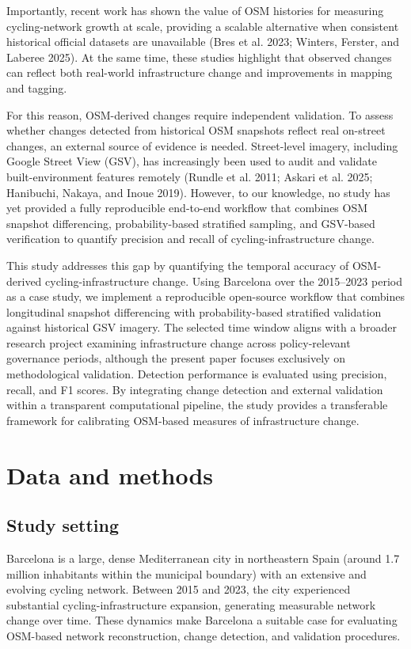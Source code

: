 \documentclass[
]{article}
\begin{document}
Importantly, recent work has shown the value of OSM histories for
measuring cycling-network growth at scale, providing a scalable
alternative when consistent historical official datasets are unavailable
(Bres et al. 2023; Winters, Ferster, and Laberee 2025). At the same
time, these studies highlight that observed changes can reflect both
real-world infrastructure change and improvements in mapping and
tagging.

For this reason, OSM-derived changes require independent validation. To
assess whether changes detected from historical OSM snapshots reflect
real on-street changes, an external source of evidence is needed.
Street-level imagery, including Google Street View (GSV), has
increasingly been used to audit and validate built-environment features
remotely (Rundle et al. 2011; Askari et al. 2025; Hanibuchi, Nakaya, and
Inoue 2019). However, to our knowledge, no study has yet provided a
fully reproducible end-to-end workflow that combines OSM snapshot
differencing, probability-based stratified sampling, and GSV-based
verification to quantify precision and recall of cycling-infrastructure
change.

This study addresses this gap by quantifying the temporal accuracy of
OSM-derived cycling-infrastructure change. Using Barcelona over the
2015--2023 period as a case study, we implement a reproducible
open-source workflow that combines longitudinal snapshot differencing
with probability-based stratified validation against historical GSV
imagery. The selected time window aligns with a broader research project
examining infrastructure change across policy-relevant governance
periods, although the present paper focuses exclusively on
methodological validation. Detection performance is evaluated using
precision, recall, and F1 scores. By integrating change detection and
external validation within a transparent computational pipeline, the
study provides a transferable framework for calibrating OSM-based
measures of infrastructure change.

\section{Data and methods}\label{data-and-methods}

\subsection{Study setting}\label{study-setting}

Barcelona is a large, dense Mediterranean city in northeastern Spain
(around 1.7 million inhabitants within the municipal boundary) with an
extensive and evolving cycling network. Between 2015 and 2023, the city
experienced substantial cycling-infrastructure expansion, generating
measurable network change over time. These dynamics make Barcelona a
suitable case for evaluating OSM-based network reconstruction, change
detection, and validation procedures.
\end{document}
